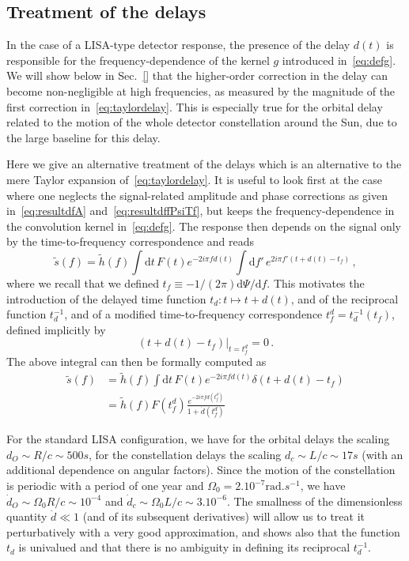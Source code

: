 \documentclass[aps,showpacs,%
prd,superscriptaddress,nofootinbib]{revtex4}
\newcommand{\be}{\begin{equation}}
\newcommand{\ee}{\end{equation}}
\newcommand\ud{{\mathrm{d}}}
\newcommand{\nn}{\nonumber}
\newcommand{\tf}{t_{f}}
\newcommand{\tfd}{t_{f}^{d}}
\begin{document}

\subsection{Treatment of the delays}
\label{subsec:delays}

In the case of a LISA-type detector response, the presence of the delay $d(t)$ is responsible for the frequency-dependence of the kernel $g$ introduced in~\eqref{eq:defg}. We will show below in Sec.~\ref{} that the higher-order correction in the delay can become non-negligible at high frequencies, as measured by the magnitude of the first correction in~\eqref{eq:taylordelay}. This is especially true for the orbital delay related to the motion of the whole detector constellation around the Sun, due to the large baseline for this delay.

Here we give an alternative treatment of the delays which is an alternative to the mere Taylor expansion of~\eqref{eq:taylordelay}. It is useful to look first at the case where one neglects the signal-related amplitude and phase corrections as given in~\eqref{eq:resultdfA} and~\eqref{eq:resultdffPsiTf}, but keeps the frequency-dependence in the convolution kernel in~\eqref{eq:defg}. The response then depends on the signal only by the time-to-frequency correspondence and reads
\begin{equation}
	\tilde{s}(f) = \tilde{h}(f) \int \ud t \, F(t) e^{-2i\pi f d(t)} \int \ud f' \, e^{2i\pi f' (t+d(t) - t_{f})} \,,
\end{equation}
where we recall that we defined $t_{f} \equiv -1/(2\pi)\ud \Psi/\ud f$. This motivates the introduction of the delayed time function $t_{d}:t \mapsto t+d(t)$, and of the reciprocal function $t_{d}^{-1}$, and of a modified time-to-frequency correspondence $\tfd = t_{d}^{-1}(\tf)$, defined implicitly by
\be
	\left. (t + d(t) - t_{f})\right|_{t=t_{f}^{d}} = 0 \,.
\ee
The above integral can then be formally computed as
\begin{align}\label{eq:delaycorrleading}
	\tilde{s}(f) &= \tilde{h}(f) \int \ud t \, F(t) e^{-2i\pi f d(t)} \delta(t + d(t) - t_{f}) \nn \\
	&= \tilde{h}(f) F(t_{f}^{d}) \frac{e^{-2i\pi f d(t_{f}^{d})}}{1+\dot{d}(t_{f}^{d})}
\end{align}

For the standard LISA configuration, we have for the orbital delays the scaling $d_{O}\sim R/c \sim 500s$, for the constellation delays the scaling $d_{c}\sim L/c \sim 17s$ (with an additional dependence on angular factors). Since the motion of the constellation is periodic with a period of one year and $\Omega_{0} = 2.10^{-7}\mathrm{rad}.s^{-1}$, we have $\dot{d}_{O} \sim \Omega_{0} R/c \sim 10^{-4}$ and $\dot{d}_{c} \sim \Omega_{0} L/c \sim 3.10^{-6}$. The smallness of the dimensionless quantity $\dot{d} \ll 1$ (and of its subsequent derivatives) will allow us to treat it perturbatively with a very good approximation, and shows also that the function $t_{d}$ is univalued and that there is no ambiguity in defining its reciprocal $t_{d}^{-1}$.
\end{document}
